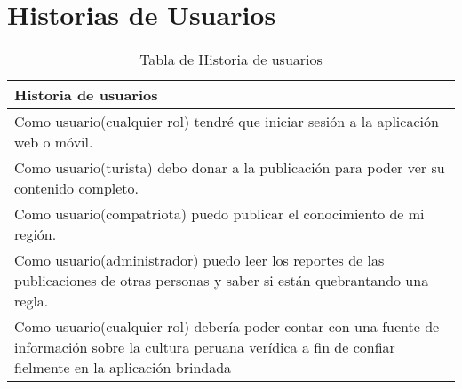 \chapter{Historias de Usuarios}
\begin{table}[htbp]
	\begin{center}
		\begin{tabular}{|p{5cm}|}
			\hline
			Historia de usuarios \\
			\hline \hline
			Como usuario(cualquier rol) tendré que iniciar sesión a la aplicación web o móvil.
			\\ \hline
			Como usuario(turista) debo donar a la publicación para poder ver su contenido completo.
			\\ \hline
			Como usuario(compatriota) puedo publicar el conocimiento de mi región.
			\\ \hline
			Como usuario(administrador) puedo leer los reportes de las publicaciones de otras personas y saber si están quebrantando una regla.
			\\ \hline
			Como usuario(cualquier rol) debería poder contar con una fuente de información sobre la cultura peruana verídica a fin de confiar fielmente en la aplicación brindada
			\\ \hline
			
			
						
		\end{tabular}
		\caption {Tabla de Historia de usuarios}
	\end{center}
\end{table}